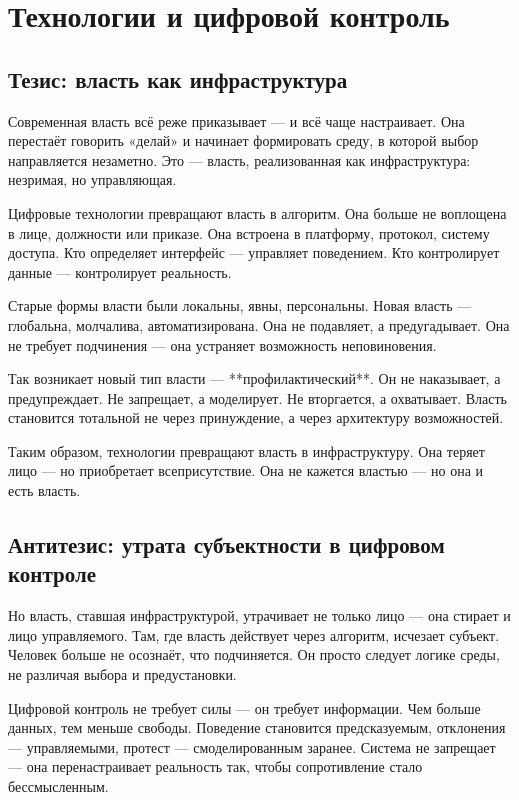 \chapter{Технологии и цифровой контроль}

\section{Тезис: власть как инфраструктура}

Современная власть всё реже приказывает — и всё чаще настраивает. Она перестаёт говорить «делай» и начинает формировать среду, в которой выбор направляется незаметно. Это — власть, реализованная как инфраструктура: незримая, но управляющая.

Цифровые технологии превращают власть в алгоритм. Она больше не воплощена в лице, должности или приказе. Она встроена в платформу, протокол, систему доступа. Кто определяет интерфейс — управляет поведением. Кто контролирует данные — контролирует реальность.

Старые формы власти были локальны, явны, персональны. Новая власть — глобальна, молчалива, автоматизирована. Она не подавляет, а предугадывает. Она не требует подчинения — она устраняет возможность неповиновения.

Так возникает новый тип власти — **профилактический**. Он не наказывает, а предупреждает. Не запрещает, а моделирует. Не вторгается, а охватывает. Власть становится тотальной не через принуждение, а через архитектуру возможностей.

Таким образом, технологии превращают власть в инфраструктуру. Она теряет лицо — но приобретает всеприсутствие. Она не кажется властью — но она и есть власть.

\section{Антитезис: утрата субъектности в цифровом контроле}

Но власть, ставшая инфраструктурой, утрачивает не только лицо — она стирает и лицо управляемого. Там, где власть действует через алгоритм, исчезает субъект. Человек больше не осознаёт, что подчиняется. Он просто следует логике среды, не различая выбора и предустановки.

Цифровой контроль не требует силы — он требует информации. Чем больше данных, тем меньше свободы. Поведение становится предсказуемым, отклонения — управляемыми, протест — смоделированным заранее. Система не запрещает — она перенастраивает реальность так, чтобы сопротивление стало бессмысленным.

